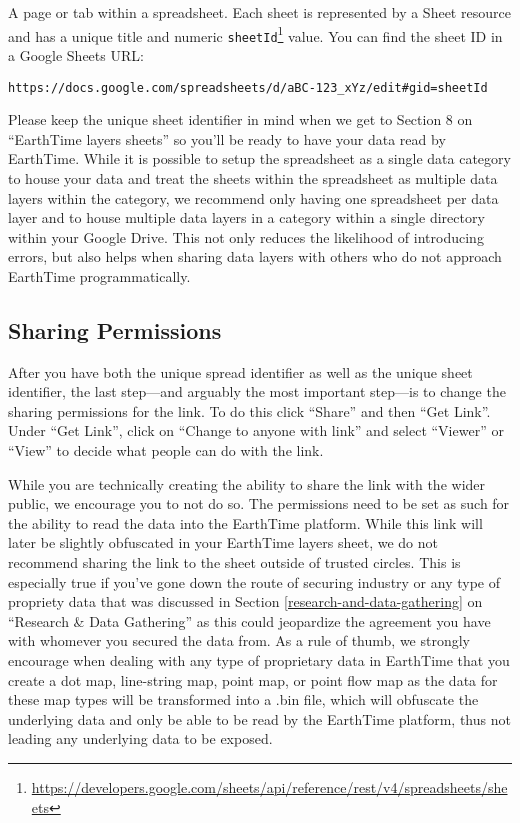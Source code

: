 \documentclass[
]{book}
\renewcommand{\href}[2]{#2\footnote{\url{#1}}}
\begin{document}
A page or tab within a spreadsheet. Each sheet is represented by a Sheet resource and has a unique title and numeric \href{https://developers.google.com/sheets/api/reference/rest/v4/spreadsheets/sheets}{\texttt{sheetId}} value. You can find the sheet ID in a Google Sheets URL:

\texttt{https://docs.google.com/spreadsheets/d/aBC-123\_xYz/edit\#gid=sheetId}

Please keep the unique sheet identifier in mind when we get to Section 8 on ``EarthTime layers sheets'' so you'll be ready to have your data read by EarthTime. While it is possible to setup the spreadsheet as a single data category to house your data and treat the sheets within the spreadsheet as multiple data layers within the category, we recommend only having one spreadsheet per data layer and to house multiple data layers in a category within a single directory within your Google Drive. This not only reduces the likelihood of introducing errors, but also helps when sharing data layers with others who do not approach EarthTime programmatically.

\hypertarget{sharing-permissions}{%
\subsection*{Sharing Permissions}\label{sharing-permissions}}


After you have both the unique spread identifier as well as the unique sheet identifier, the last step---and arguably the most important step---is to change the sharing permissions for the link. To do this click ``Share'' and then ``Get Link''. Under ``Get Link'', click on ``Change to anyone with link'' and select ``Viewer'' or ``View'' to decide what people can do with the link.

While you are technically creating the ability to share the link with the wider public, we encourage you to not do so. The permissions need to be set as such for the ability to read the data into the EarthTime platform. While this link will later be slightly obfuscated in your EarthTime layers sheet, we do not recommend sharing the link to the sheet outside of trusted circles. This is especially true if you've gone down the route of securing industry or any type of propriety data that was discussed in Section \ref{research-and-data-gathering} on ``Research \& Data Gathering'' as this could jeopardize the agreement you have with whomever you secured the data from. As a rule of thumb, we strongly encourage when dealing with any type of proprietary data in EarthTime that you create a dot map, line-string map, point map, or point flow map as the data for these map types will be transformed into a .bin file, which will obfuscate the underlying data and only be able to be read by the EarthTime platform, thus not leading any underlying data to be exposed.
\end{document}
